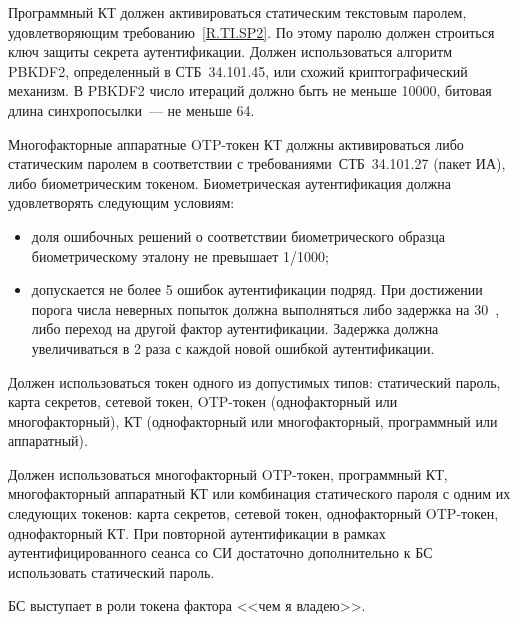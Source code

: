 
Программный КТ должен активироваться статическим текстовым  
паролем, удовлетворяющим требованию~\ref{R.TI.SP2}.
По этому паролю должен строиться ключ защиты секрета аутентификации.
Должен использоваться алгоритм PBKDF2, определенный в СТБ~34.101.45,
или схожий криптографический механизм.
%
В PBKDF2 число итераций должно быть не меньше 10000,
битовая длина синхропосылки~--- не меньше 64.

Многофакторные аппаратные OTP-токен  КТ должны активироваться 
либо статическим паролем в соответствии с требованиями~СТБ~34.101.27 (пакет ИА),
либо биометрическим токеном.
%
Биометрическая аутентификация должна удовлетворять следующим условиям:
\begin{itemize}
\item
доля ошибочных решений о соответствии биометрического образца биометрическому эталону 
не превышает 1/1000;
% 
%
%
\item
допускается не более 5 ошибок аутентификации подряд. При достижении порога числа
неверных попыток должна выполняться либо задержка на 30~, либо
переход на другой фактор аутентификации. Задержка должна увеличиваться в 2 раза
с каждой новой ошибкой аутентификации.
\end{itemize}


Должен использоваться токен одного из допустимых типов:
статический пароль, карта секретов, сетевой токен,
OTP-токен (однофакторный или многофакторный), 
КТ (однофакторный или многофакторный, программный или аппаратный).

\label{R.TI.AAL2}
Должен использоваться многофакторный OTP-токен, программный КТ, многофакторный 
аппаратный КТ или комбинация статического пароля с одним их следующих токенов:
карта секретов, сетевой токен, однофакторный OTP-токен, 
однофакторный  КТ. 
%
При повторной аутентификации в рамках аутентифицированного сеанса со СИ 
достаточно дополнительно к БС использовать статический пароль.

\begin{note*}
БС выступает в роли токена фактора <<чем я владею>>.
\end{note*}

